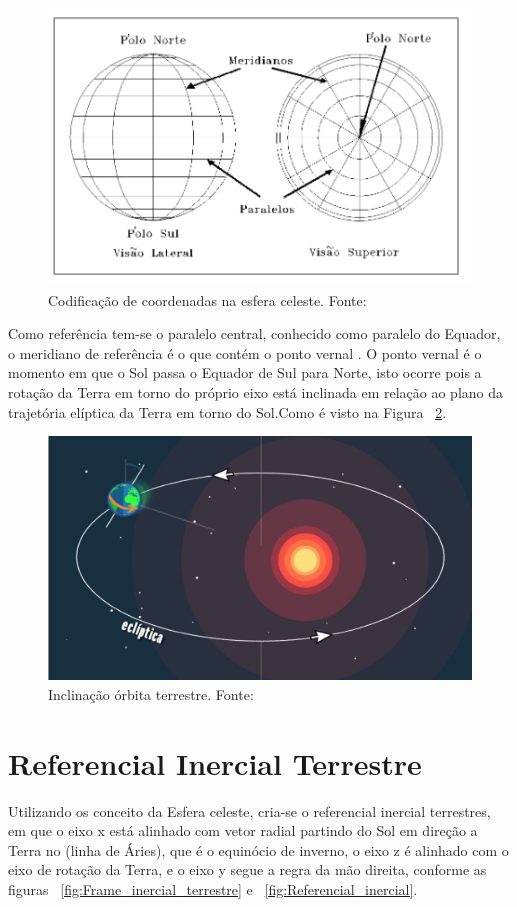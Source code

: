 \begin{figure}[!h]
	\centering
	\includegraphics[width=.7\columnwidth]{images/codficacao_cod_esferas_celetes.png}
	\caption{Codificação de coordenadas na esfera celeste. Fonte: ~\cite[]{Carvalho}}
	\label{fig:codficacao_cod_esferas_celetes}
\end{figure}

Como referência tem-se o paralelo central, conhecido como paralelo do Equador,  o meridiano de referência é o que contém o ponto vernal . O ponto vernal é o momento em que o Sol passa o Equador de Sul para Norte, isto ocorre pois a rotação da Terra em torno do próprio eixo está inclinada em relação ao plano da trajetória elíptica da Terra em torno do Sol.Como é visto na Figura  ~\ref{fig:inclinacao}.

\begin{figure}[!h]
	\centering
	\includegraphics[width=.7\columnwidth]{images/inclinacao.jpg}
	\caption{Inclinação órbita terrestre. Fonte: ~\cite[]{Portal_do_Astronomo}}
	\label{fig:inclinacao}
\end{figure}

\section{Referencial Inercial Terrestre}

Utilizando os conceito da  Esfera celeste, cria-se o referencial inercial terrestres, em que o eixo x está alinhado com vetor radial partindo do Sol em direção a Terra no (linha de Áries), que é o equinócio de inverno, o eixo z é alinhado com o eixo de rotação da Terra, e o eixo y segue a regra da mão direita, conforme as figuras ~\ref{fig:Frame_inercial_terrestre} e ~\ref{fig:Referencial_inercial}.

